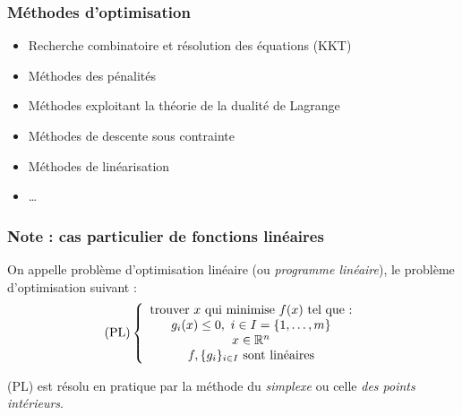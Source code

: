 \documentclass{beamer}
\newcommand{\R}{{\ensuremath\mathbb{R}}}
\begin{document}
\begin{frame}
  \frametitle{Méthodes d'optimisation}

  \begin{itemize}
  \item Recherche combinatoire et résolution des équations (KKT)
  \item Méthodes des pénalités
  \item Méthodes exploitant la théorie de la dualité de Lagrange
  \item Méthodes de descente sous contrainte
  \item Méthodes de linéarisation
  \item \dots
  \end{itemize}
  
\end{frame}

\begin{frame}
  \frametitle{Note : cas particulier de fonctions linéaires}

  On appelle problème d'optimisation linéaire (ou \emph{programme linéaire}),
  le problème d'optimisation suivant : 
  \[
  \text{(PL)} \left\{
  \begin{array}{c}
    \text{trouver} \ x \ \text{qui minimise} \ f(x) \ \text{tel que :} \\
    g_i(x) \leq 0, \ i \in I = \{1, \dots, m\} \\
    x \in \R^n \\
    f, \{g_i\}_{i \in I} \ \text{sont linéaires} \\
  \end{array}
  \right.
  \]

  (PL) est résolu en pratique par la méthode du \emph{simplexe}
  ou celle \emph{des points intérieurs}.
\end{frame}
\end{document}
